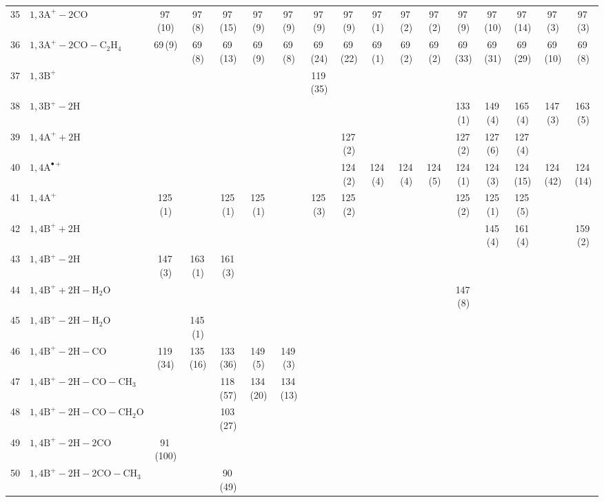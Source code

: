 \documentclass[]{article}
\begin{document}
\begin{table}
{\begin{tabular}{ll|ccccc|ccccc|ccccc}
  35 & $\mathrm{1{,}3A^+{-}2CO}$ & 97\,(10) & 97\,(8) & 97\,(15) & 97\,(9) & 97\,(9) & 97\,(9) & 97\,(9) & 97\,(1) & 97\,(2) & 97\,(2) & 97\,(9) & 97\,(10) & 97\,(14) & 97\,(3) & 97\,(3) \\ 
  36 & $\mathrm{1{,}3A^+{-}2CO{-}C_{2}H_{4}}$ & 69\,(9) & 69\,(8) & 69\,(13) & 69\,(9) & 69\,(8) & 69\,(24) & 69\,(22) & 69\,(1) & 69\,(2) & 69\,(2) & 69\,(33) & 69\,(31) & 69\,(29) & 69\,(10) & 69\,(8) \\ 
  37 & $\mathrm{1{,}3B^+}$ &  &  &  &  &  & 119\,(35) &  &  &  &  &  &  &  &  &  \\ 
  38 & $\mathrm{1{,}3B^+{-}2H}$ &  &  &  &  &  &  &  &  &  &  & 133\,(1) & 149\,(4) & 165\,(4) & 147\,(3) & 163\,(5) \\ 
  39 & $\mathrm{1{,}4A^+{+}2H}$ &  &  &  &  &  &  & 127\,(2) &  &  &  & 127\,(2) & 127\,(6) & 127\,(4) &  &  \\ 
  40 & $\mathrm{1{,}4A^{\bullet+}}$ &  &  &  &  &  &  & 124\,(2) & 124\,(4) & 124\,(4) & 124\,(5) & 124\,(1) & 124\,(3) & 124\,(15) & 124\,(42) & 124\,(14) \\ 
  41 & $\mathrm{1{,}4A^+}$ & 125\,(1) &  & 125\,(1) & 125\,(1) &  & 125\,(3) & 125\,(2) &  &  &  & 125\,(2) & 125\,(1) & 125\,(5) &  &  \\ 
  42 & $\mathrm{1{,}4B^+{+}2H}$ &  &  &  &  &  &  &  &  &  &  &  & 145\,(4) & 161\,(4) &  & 159\,(2) \\ 
  43 & $\mathrm{1{,}4B^+{-}2H}$ & 147\,(3) & 163\,(1) & 161\,(3) &  &  &  &  &  &  &  &  &  &  &  &  \\ 
  44 & $\mathrm{1{,}4B^+{+}2H{-}H_{2}O}$ &  &  &  &  &  &  &  &  &  &  & 147\,(8) &  &  &  &  \\ 
  45 & $\mathrm{1{,}4B^+{-}2H{-}H_{2}O}$ &  & 145\,(1) &  &  &  &  &  &  &  &  &  &  &  &  &  \\ 
  46 & $\mathrm{1{,}4B^+{-}2H{-}CO}$ & 119\,(34) & 135\,(16) & 133\,(36) & 149\,(5) & 149\,(3) &  &  &  &  &  &  &  &  &  &  \\ 
  47 & $\mathrm{1{,}4B^+{-}2H{-}CO{-}CH_{3}}$ &  &  & 118\,(57) & 134\,(20) & 134\,(13) &  &  &  &  &  &  &  &  &  &  \\ 
  48 & $\mathrm{1{,}4B^+{-}2H{-}CO{-}CH_{2}O}$ &  &  & 103\,(27) &  &  &  &  &  &  &  &  &  &  &  &  \\ 
  49 & $\mathrm{1{,}4B^+{-}2H{-}2CO}$ & 91\,(100) &  &  &  &  &  &  &  &  &  &  &  &  &  &  \\ 
  50 & $\mathrm{1{,}4B^+{-}2H{-}2CO{-}CH_{3}}$ &  &  & 90\,(49) &  &  &  &  &  &  &  &  &  &  &  &  \\ 

\end{tabular}}
\end{table}
\end{document}
